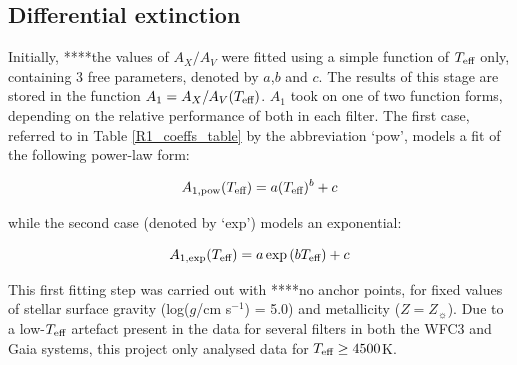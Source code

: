 \documentclass[usenatbib]{mnras}
\begin{document}
\subsection{Differential extinction}
Initially, ****the values of $A_{X}/A_{V}$ were fitted using a simple function of $T_{\textnormal{eff}}$ only, containing 3 free parameters, denoted by $a$,$b$ and $c$. The results of this stage are stored in the function $A_{1} = A_{X}/A_{V}(T_{\textnormal{eff}})$. $A_{1}$ took on one of two function forms, depending on the relative performance of both in each filter. The first case, referred to in Table \ref{R1_coeffs_table} by the abbreviation `pow', models a fit of the following power-law form:

\begin{equation}
A_{1,\textnormal{pow}} (T_{\textnormal{eff}}) = a (T_{\textnormal{eff}})^{b} + c
\label{Teff_pow}
\end{equation}

while the second case (denoted by `exp') models an exponential:

\begin{equation}
A_{1,\textnormal{exp}} (T_{\textnormal{eff}}) = a \exp{(b T_{\textnormal{eff}})} + c
\label{Teff_exp}
\end{equation}

This first fitting step was carried out with ****no anchor points, for  fixed values of stellar surface gravity (log($g$/cm s$^{-1}$) = 5.0) and metallicity ($Z = Z_{\sun}$). Due to a low-$T_{\textnormal{eff}}$ artefact present in the data for several filters in both the WFC3 and Gaia systems, this project only analysed data for $T_{\textnormal{eff}} \geq 4500$K.
\end{document}
